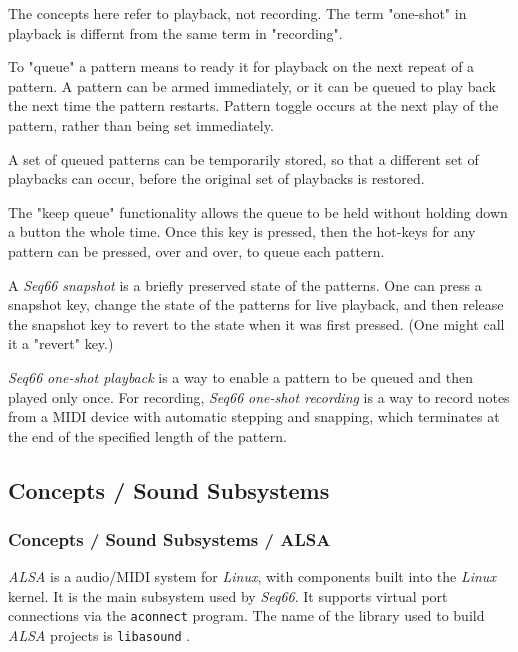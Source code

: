    The concepts here refer to playback, not recording.  The term "one-shot" in
   playback is differnt from the same term in "recording".

   To "queue" a pattern means to ready it for playback on the next repeat of
   a pattern.  A pattern can be armed immediately, or it can be queued to
   play back the next time the pattern restarts.
   Pattern toggle occurs at the next play of the pattern,
   rather than being set immediately.

   A set of queued patterns can be temporarily stored, so that a different
   set of playbacks can occur, before the original set of playbacks is
   restored.

   The "keep queue" functionality allows the queue to be held without
   holding down a button the whole time.  Once this key is pressed,
   then the hot-keys for any pattern can be pressed, over and over,
   to queue each pattern.

   A \textsl{Seq66} \textsl{snapshot} is a briefly preserved
   state of the patterns.  One can press a snapshot key, change the state of
   the patterns for live playback, and then release the snapshot key to
   revert to the state when it was first pressed.  (One might call it a
   "revert" key.)

   \textsl{Seq66} \textsl{one-shot playback} is a way to enable a pattern to be
   queued and then played only once.
   For recording, 
   \textsl{Seq66} \textsl{one-shot recording} is a way to record notes from a
   MIDI device with automatic stepping and snapping, which terminates at the
   end of the specified length of the pattern.

\subsection{Concepts / Sound Subsystems}
\label{subsec:concepts_sound_subsystems}

\subsubsection{Concepts / Sound Subsystems / ALSA}
\label{subsubsec:concepts_sound_alsa}

   \textsl{ALSA} is a audio/MIDI system for \textsl{Linux}, with components built
   into the \textsl{Linux} kernel. It is the main subsystem used by
   \textsl{Seq66}.
   It supports virtual port connections via the \texttt{aconnect} program.
   The name of the library used to build
   \textsl{ALSA} projects is \texttt{libasound} \cite{alsa}.

